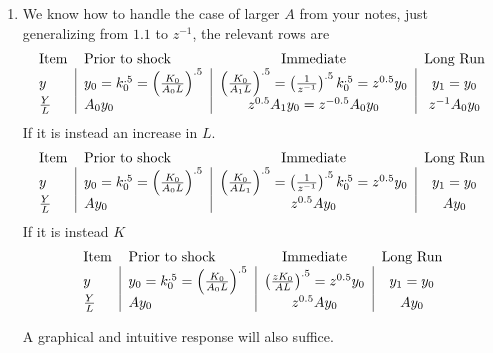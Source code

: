 \documentclass{article}
\begin{document}
\begin{enumerate}
\begin{enumerate}
\item We know how to handle the case of larger $A$ from your notes, just
generalizing from $1.1$ to $z^{-1}$, the relevant rows are     
\begin{equation*}
\begin{tabular}{llcc}
Item & Prior to shock & Immediate & Long Run \\ 
$y$ & \multicolumn{1}{|l}{$y_{0}=k_{0}^{.5}=\left( \frac{K_{0}}{A_{0}L}%
\right) ^{.5}$} & \multicolumn{1}{|c}{$\left( \frac{K_{0}}{A_{1}L}\right)
^{.5}=\left( \frac{1}{z^{-1}}\right) ^{.5}k_{0}^{.5}=z^{0.5}y_{0}$ } & 
\multicolumn{1}{|c}{$y_{1}=y_{0}$} \\ 
$\frac{Y}{L}$ & \multicolumn{1}{|l}{$A_{0}y_{0}$} & \multicolumn{1}{|c}{$%
z^{0.5}A_{1}y_{0}=z^{-0.5}A_{0}y_{0}$} & \multicolumn{1}{|c}{$%
z^{-1}A_{0}y_{0}$}%
\end{tabular}%
\end{equation*}%
If it is instead an increase in $L.$%
\begin{equation*}
\begin{tabular}{llcc}
Item & Prior to shock & Immediate & Long Run \\ 
$y$ & \multicolumn{1}{|l}{$y_{0}=k_{0}^{.5}=\left( \frac{K_{0}}{A_{0}L}%
\right) ^{.5}$} & \multicolumn{1}{|c}{$\left( \frac{K_{0}}{AL_{1}}\right)
^{.5}=\left( \frac{1}{z^{-1}}\right) ^{.5}k_{0}^{.5}=z^{0.5}y_{0}$ } & 
\multicolumn{1}{|c}{$y_{1}=y_{0}$} \\ 
$\frac{Y}{L}$ & \multicolumn{1}{|l}{$Ay_{0}$} & \multicolumn{1}{|c}{$%
z^{0.5}Ay_{0}$} & \multicolumn{1}{|c}{$Ay_{0}$}%
\end{tabular}%
\end{equation*}%
If it is instead $K$ 
\begin{equation*}
\begin{tabular}{llcc}
Item & Prior to shock & Immediate & Long Run \\ 
$y$ & \multicolumn{1}{|l}{$y_{0}=k_{0}^{.5}=\left( \frac{K_{0}}{A_{0}L}%
\right) ^{.5}$} & \multicolumn{1}{|c}{$\left( \frac{zK_{0}}{AL}\right)
^{.5}=z^{0.5}y_{0}$ } & \multicolumn{1}{|c}{$y_{1}=y_{0}$} \\ 
$\frac{Y}{L}$ & \multicolumn{1}{|l}{$Ay_{0}$} & \multicolumn{1}{|c}{$%
z^{0.5}Ay_{0}$} & \multicolumn{1}{|c}{$Ay_{0}$}%
\end{tabular}%
\end{equation*}

A graphical and intuitive response will also suffice. 


\end{enumerate}
\end{enumerate}
\end{document}
